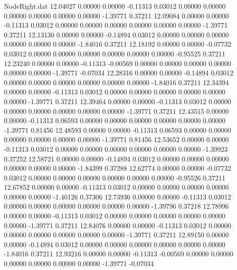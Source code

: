 \begin{filecontents}{NodeRight.dat}
  12.04027    0.00000    0.00000    -0.11313    0.03012    0.00000    0.00000    0.00000    0.00000    0.00000    0.00000   -1.39771    0.37211
  12.09084    0.00000    0.00000    -0.11313    0.03012    0.00000    0.00000    0.00000    0.00000    0.00000    0.00000   -1.39771    0.37211
  12.13130    0.00000    0.00000    -0.14894    0.03012    0.00000    0.00000    0.00000    0.00000    0.00000    0.00000   -1.84016    0.37211
  12.18192    0.00000    0.00000    -0.07732    0.03012    0.00000    0.00000    0.00000    0.00000    0.00000    0.00000   -0.95525    0.37211
  12.23240    0.00000    0.00000    -0.11313   -0.00569    0.00000    0.00000    0.00000    0.00000    0.00000    0.00000   -1.39771   -0.07034
  12.28316    0.00000    0.00000    -0.14894    0.03012    0.00000    0.00000    0.00000    0.00000    0.00000    0.00000   -1.84016    0.37211
  12.34394    0.00000    0.00000    -0.11313    0.03012    0.00000    0.00000    0.00000    0.00000    0.00000    0.00000   -1.39771    0.37211
  12.39464    0.00000    0.00000    -0.11313    0.03012    0.00000    0.00000    0.00000    0.00000    0.00000    0.00000   -1.39771    0.37211
  12.43515    0.00000    0.00000    -0.11313    0.06593    0.00000    0.00000    0.00000    0.00000    0.00000    0.00000   -1.39771    0.81456
  12.48593    0.00000    0.00000    -0.11313    0.06593    0.00000    0.00000    0.00000    0.00000    0.00000    0.00000   -1.39771    0.81456
  12.53652    0.00000    0.00000    -0.11313    0.03012    0.00000    0.00000    0.00000    0.00000    0.00000    0.00000   -1.39923    0.37252
  12.58721    0.00000    0.00000    -0.14894    0.03012    0.00000    0.00000    0.00000    0.00000    0.00000    0.00000   -1.84399    0.37288
  12.62774    0.00000    0.00000    -0.07732    0.03012    0.00000    0.00000    0.00000    0.00000    0.00000    0.00000   -0.95526    0.37211
  12.67852    0.00000    0.00000    -0.11313    0.03012    0.00000    0.00000    0.00000    0.00000    0.00000    0.00000   -1.40126    0.37306
  12.73936    0.00000    0.00000    -0.11313    0.03012    0.00000    0.00000    0.00000    0.00000    0.00000    0.00000   -1.39796    0.37218
  12.78996    0.00000    0.00000    -0.11313    0.03012    0.00000    0.00000    0.00000    0.00000    0.00000    0.00000   -1.39771    0.37211
  12.84076    0.00000    0.00000    -0.11313    0.03012    0.00000    0.00000    0.00000    0.00000    0.00000    0.00000   -1.39771    0.37211
  12.89150    0.00000    0.00000    -0.14894    0.03012    0.00000    0.00000    0.00000    0.00000    0.00000    0.00000   -1.84016    0.37211
  12.93216    0.00000    0.00000    -0.11313   -0.00569    0.00000    0.00000    0.00000    0.00000    0.00000    0.00000   -1.39771   -0.07034

\end{filecontents}
